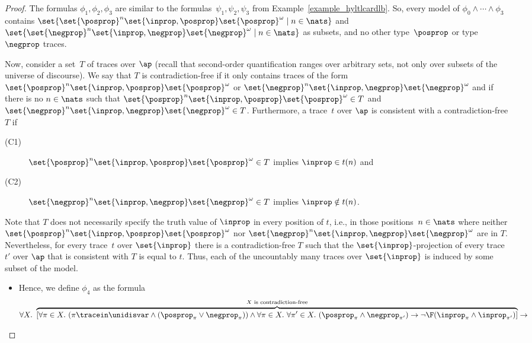 \begin{proof}
The formulas $\phi_1, \phi_2, \phi_3$ are similar to the formulas~$\psi_1, \psi_2, \psi_3$ from Example~\ref{example_hyltlcardlb}. 
So, every model of $\phi_0 \wedge \cdots \wedge \phi_3$ contains $\set{\set{\posprop}^n \set{\inprop,\posprop} \set{\posprop}^\omega \mid n\in\nats}$ and $\set{\set{\negprop}^n \set{\inprop,\negprop} \set{\negprop}^\omega \mid n\in\nats}$ as subsets, and no other type~$\posprop$ or type~$\negprop$ traces.

Now, consider a set~$T$ of traces over $\ap$ (recall that second-order quantification ranges over arbitrary sets, not only over subsets of the universe of discourse).
We say that $T$ is contradiction-free if it only contains traces of the form~$\set{\posprop}^n \set{\inprop,\posprop} \set{\posprop}^\omega$ or $\set{\negprop}^n \set{\inprop,\negprop} \set{\negprop}^\omega$ and if there is no $n \in \nats$ such that $\set{\posprop}^n \set{\inprop,\posprop} \set{\posprop}^\omega \in T$ and $\set{\negprop}^n \set{\inprop,\negprop} \set{\negprop}^\omega \in T$. 
Furthermore, a trace~$t$ over $\ap$ is consistent with a contradiction-free $T$ if 
\begin{description}
    \item[(C1)] $\set{\posprop}^n \set{\inprop,\posprop} \set{\posprop}^\omega \in T$ implies $\inprop\in t(n)$ and
    \item[(C2)] $\set{\negprop}^n \set{\inprop,\negprop} \set{\negprop}^\omega \in T$ implies $\inprop\notin t(n)$.
\end{description}
Note that $T$ does not necessarily specify the truth value of $\inprop$ in every position of $t$, i.e., in those positions~$n\in\nats$ where neither $\set{\posprop}^n \set{\inprop,\posprop} \set{\posprop}^\omega$ nor $\set{\negprop}^n \set{\inprop,\negprop} \set{\negprop}^\omega$ are in $T$.
Nevertheless, for every trace~$t$ over $\set{\inprop}$ there is a contradiction-free $T$ such that the $\set{\inprop}$-projection of every trace~$t'$ over $\ap$ that is consistent with $T$ is equal to $t$. 
Thus, each of the uncountably many traces over $\set{\inprop}$ is induced by some subset of the model.
\begin{itemize}
\item Hence, we define $\phi_4$ as the formula
\begin{align*}
\forall X.\ {}&{} \overbrace{[ \forall \pi \in X.\ (\pi\tracein \unidisvar \wedge (\posprop_\pi \vee \negprop_\pi)) \wedge \forall \pi \in X.\ \forall \pi' \in X.\ (\posprop_\pi \wedge \negprop_{\pi'}) \rightarrow \neg \F(\inprop_{\pi} \wedge \inprop_{\pi'}) ]}^{\text{$X$ is contradiction-free}} \rightarrow \\

\end{align*}
\end{itemize}
\end{proof}
